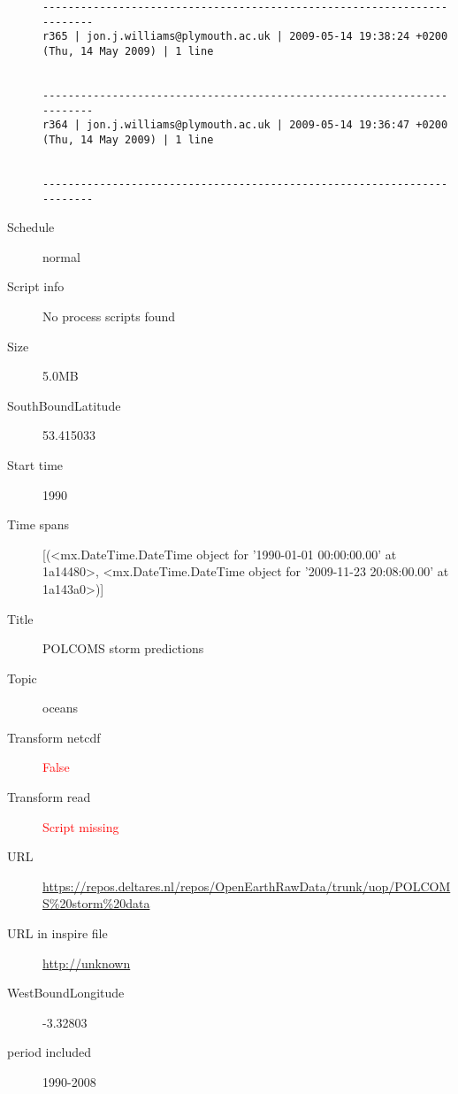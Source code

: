 \documentclass[9]{report}
\begin{document}
\begin{description}
\begin{verbatim}
------------------------------------------------------------------------
r365 | jon.j.williams@plymouth.ac.uk | 2009-05-14 19:38:24 +0200 (Thu, 14 May 2009) | 1 line


------------------------------------------------------------------------
r364 | jon.j.williams@plymouth.ac.uk | 2009-05-14 19:36:47 +0200 (Thu, 14 May 2009) | 1 line


------------------------------------------------------------------------

\end{verbatim}
  \item[Schedule] normal
  \item[Script info] No process scripts found
  \item[Size] 5.0MB
  \item[SouthBoundLatitude] 53.415033
  \item[Start time] 1990
  \item[Time spans] [(<mx.DateTime.DateTime object for '1990-01-01 00:00:00.00' at 1a14480>, <mx.DateTime.DateTime object for '2009-11-23 20:08:00.00' at 1a143a0>)]
  \item[Title]  POLCOMS storm predictions 
  \item[Topic] oceans
  \item[Transform netcdf] \textcolor{red}{False}
  \item[Transform read] \textcolor{red}{Script missing}
  \item[URL] \href{https://repos.deltares.nl/repos/OpenEarthRawData/trunk/uop/POLCOMS\%20storm\%20data}{https://repos.deltares.nl/repos/OpenEarthRawData/trunk/uop/POLCOMS\%20storm\%20data}
  \item[URL in inspire file] \href{http://unknown}{http://unknown}
  \item[WestBoundLongitude] -3.32803
  \item[period included] 1990-2008
\end{description}
\end{document}
